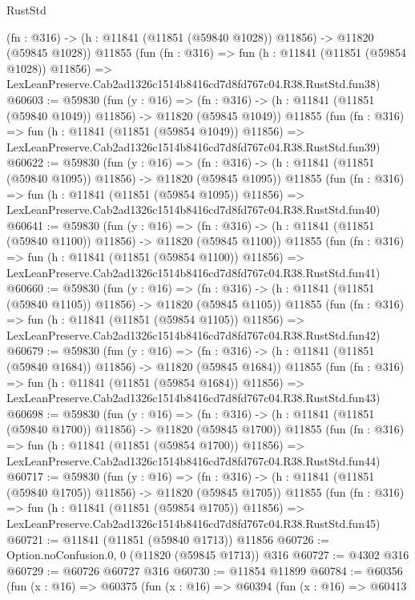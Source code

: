 \begin{lexlean}{RustStd}
\begin{coremodule}
    (fn : @316) -> (h : @11841 (@11851 (@59840 @1028)) @11856) -> @11820 (@59845 @1028))
    @11855
    (fun (fn : @316) =>
    fun (h : @11841 (@11851 (@59854 @1028)) @11856) =>
    LexLeanPreserve.Cab2ad1326c1514b8416cd7d8fd767c04.R38.RustStd.fun38)
@60603 := @59830
    (fun (y : @16) =>
    (fn : @316) -> (h : @11841 (@11851 (@59840 @1049)) @11856) -> @11820 (@59845 @1049))
    @11855
    (fun (fn : @316) =>
    fun (h : @11841 (@11851 (@59854 @1049)) @11856) =>
    LexLeanPreserve.Cab2ad1326c1514b8416cd7d8fd767c04.R38.RustStd.fun39)
@60622 := @59830
    (fun (y : @16) =>
    (fn : @316) -> (h : @11841 (@11851 (@59840 @1095)) @11856) -> @11820 (@59845 @1095))
    @11855
    (fun (fn : @316) =>
    fun (h : @11841 (@11851 (@59854 @1095)) @11856) =>
    LexLeanPreserve.Cab2ad1326c1514b8416cd7d8fd767c04.R38.RustStd.fun40)
@60641 := @59830
    (fun (y : @16) =>
    (fn : @316) -> (h : @11841 (@11851 (@59840 @1100)) @11856) -> @11820 (@59845 @1100))
    @11855
    (fun (fn : @316) =>
    fun (h : @11841 (@11851 (@59854 @1100)) @11856) =>
    LexLeanPreserve.Cab2ad1326c1514b8416cd7d8fd767c04.R38.RustStd.fun41)
@60660 := @59830
    (fun (y : @16) =>
    (fn : @316) -> (h : @11841 (@11851 (@59840 @1105)) @11856) -> @11820 (@59845 @1105))
    @11855
    (fun (fn : @316) =>
    fun (h : @11841 (@11851 (@59854 @1105)) @11856) =>
    LexLeanPreserve.Cab2ad1326c1514b8416cd7d8fd767c04.R38.RustStd.fun42)
@60679 := @59830
    (fun (y : @16) =>
    (fn : @316) -> (h : @11841 (@11851 (@59840 @1684)) @11856) -> @11820 (@59845 @1684))
    @11855
    (fun (fn : @316) =>
    fun (h : @11841 (@11851 (@59854 @1684)) @11856) =>
    LexLeanPreserve.Cab2ad1326c1514b8416cd7d8fd767c04.R38.RustStd.fun43)
@60698 := @59830
    (fun (y : @16) =>
    (fn : @316) -> (h : @11841 (@11851 (@59840 @1700)) @11856) -> @11820 (@59845 @1700))
    @11855
    (fun (fn : @316) =>
    fun (h : @11841 (@11851 (@59854 @1700)) @11856) =>
    LexLeanPreserve.Cab2ad1326c1514b8416cd7d8fd767c04.R38.RustStd.fun44)
@60717 := @59830
    (fun (y : @16) =>
    (fn : @316) -> (h : @11841 (@11851 (@59840 @1705)) @11856) -> @11820 (@59845 @1705))
    @11855
    (fun (fn : @316) =>
    fun (h : @11841 (@11851 (@59854 @1705)) @11856) =>
    LexLeanPreserve.Cab2ad1326c1514b8416cd7d8fd767c04.R38.RustStd.fun45)
@60721 := @11841 (@11851 (@59840 @1713)) @11856
@60726 := Option.noConfusion.{0, 0} (@11820 (@59845 @1713)) @316
@60727 := @4302 @316
@60729 := @60726 @60727 @316
@60730 := @11854 @11899
@60784 := @60356
    (fun (x : @16) =>
    @60375
      (fun (x : @16) =>
      @60394
        (fun (x : @16) =>
        @60413

\end{coremodule}
\end{lexlean}
